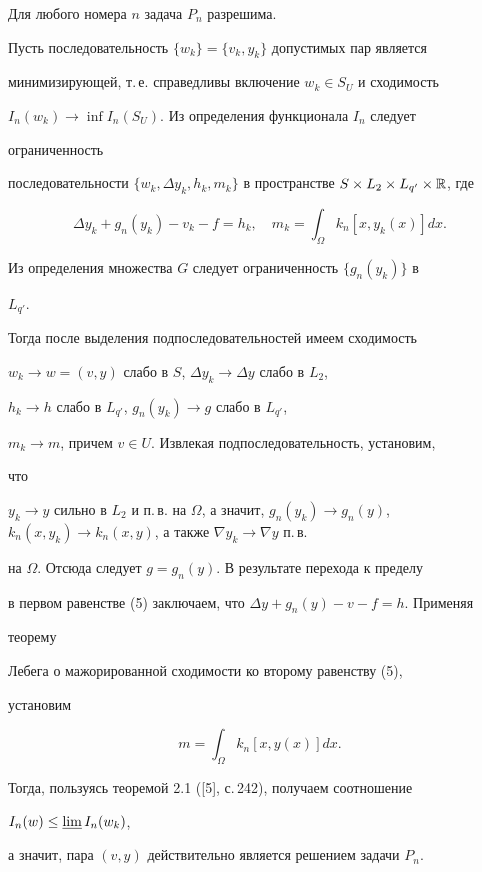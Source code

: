 \begin{thm} 


Для любого номера $n$ задача $P_n$ разрешима. 


\end{thm} 


 


\begin{pf} 


Пусть последовательность $\{w_k\}=\{v_k,y_k\}$ допустимых пар является 


минимизирующей, т.\,е. справедливы включение $w_k\in S_U$ и сходимость 


$I_n(w_k)\to\inf I_n(S_U)$. Из определения функционала $I_n$ следует 


ограниченность 


последовательности $\{w_k,\Delta y_k,h_k,m_k\}$ в пространстве $S\times 


L_2\times L_{q'}\times\Bbb R$, где 


\begin{equation} 


\Delta y_k+g_n(y_k)-v_k-f=h_k,\quad m_k=\int_\Omega 


k_n[x,y_k(x)]dx. 


\end{equation} 


Из определения множества $G$ следует ограниченность $\{g_n(y_k)\}$ в 


$L_{q'}$. 


Тогда после выделения подпоследовательностей имеем сходимость 


$w_k\to w=(v,y)$ слабо в $S$, $\Delta y_k\to\Delta y$ слабо в $L_2$, 


$h_k\to h$ слабо в $L_{q'}$, $g_n(y_k)\to g$ слабо в $L_{q'}$, 


$m_k\to m$, причем $v\in U$. Извлекая подпоследовательность, установим, 


что 


$y_k\to y$ сильно в $L_2$ и п.\,в. на $\Omega$, а значит, $g_n(y_k)\to 


g_n(y)$, $k_n(x,y_k)\to k_n(x,y)$, а также $\nabla y_k\to \nabla y$ п.\,в. 


на $\Omega$. Отсюда следует $g=g_n(y)$. В результате перехода к пределу 


в первом равенстве (5) заключаем, что $\Delta y+g_n(y)-v-f=h$. Применяя 


теорему 


Лебега о мажорированной сходимости ко второму равенству (5), 


установим 


$$ 


m=\int_\Omega k_n[x,y(x)]dx. 


$$ 


Тогда, пользуясь теоремой 2.1 ([5], с.\,242), получаем соотношение 


$I_n(w)\le\varliminf I_n(w_k)$, 


а значит, пара $(v,y)$ действительно является решением задачи $P_n$. 


\end{pf} 


